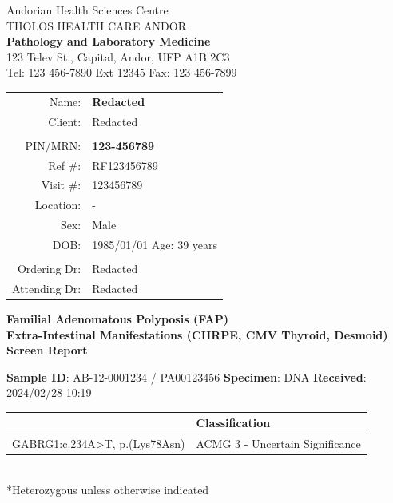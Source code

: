 \documentclass[9pt]{extarticle}
\begin{document}
\parbox[b][][]{.42\textwidth}{
\centering
Andorian Health Sciences Centre\\
THOLOS HEALTH CARE ANDOR \\
\vspace{1em}
{\bf Pathology and Laboratory Medicine}\\ 
\vspace{1em}
123 Telev St., Capital, Andor, UFP A1B 2C3 \\
Tel: 123 456-7890 Ext 12345 Fax: 123 456-7899
}
\hfill
\parbox{.55\textwidth}{
\large
\begin{tabular}{r l}
Name: & {\bf Redacted}\\
Client:  & Redacted\\
& \\
PIN/MRN:  & {\bf 123-456789} \\
Ref \#: &  RF123456789 \\
Visit \#: &  123456789 \\
Location: &  -\\
Sex: & Male \\
DOB:  & 1985/01/01 \hspace{1ex} Age:\hspace{1ex} 39 years \\
& \\
Ordering Dr:  & Redacted \\
Attending Dr:  & Redacted\\
\end{tabular}
}


\vspace{1ex}
\begin{center}
\Large \bf
Familial Adenomatous Polyposis (FAP)\\
Extra-Intestinal Manifestations (CHRPE, CMV Thyroid, Desmoid) Screen Report
\end{center}
\vspace{1ex}

{\bf Sample ID}: AB-12-0001234 / PA00123456 \hspace{2em} {\bf Specimen}: DNA \hspace{2em} {\bf Received}: 2024/02/28 10:19\\
\begin{tabular}{ | >{\centering\arraybackslash}p{9cm} | >{\centering\arraybackslash}p{9cm} | }
\hline
{\large \bf Variant*} & {\large \bf Classification} \\ \hline
GABRG1:c.234A>T, p.(Lys78Asn) & ACMG 3 - Uncertain Significance \\ \hline
\end{tabular}
\\ *Heterozygous unless otherwise indicated
\end{document}
